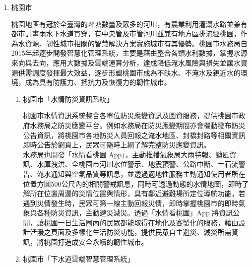 \documentclass[a4paper,12pt]{article}
\begin{document}
\begin{enumerate}
\begin{enumerate}
「脫煤者聯盟」係由英國和加拿大政府共同成立，致力於將燃煤發電轉換為乾淨能源，透過與各國地方政府及組織共同推動老舊燃煤電廠退場，逐步停止使用燃煤以減緩氣候變遷衝擊，並協助實現巴黎協定目標，控制地球氣溫的上升幅度在與「前工業時代」相比最多\(2^{\circ}C\)之範圍。該聯盟現有91個成員，包括32個國家，25個地方政府和34個企業組織，新北市為臺灣第一個，也是繼韓國忠清南道後亞洲第二個加入聯盟的地方政府成員，將持續於國際平臺分享新北市減緩氣候變遷及燃煤退場經驗，增進互動與交流\footnote{\href{https://www.epd.ntpc.gov.tw/Article/Info?ID=6011}{全國第一 新北正式成為「脫煤者聯盟」成員 與英、加等國攜手對抗氣候變遷}\\}。\\
\end{enumerate}

\item 桃園市
\label{sec:orgbcd526b}

桃園地區有冠於全臺灣的埤塘數量及眾多的河川，有農業利用灌溉水路並兼有都市計畫雨水下水道貫穿，有中央管及市管河川並兼有地方區排流經桃園，作為水資源、韌性城市相關的智慧解決方案實施城市有其優勢。桃園市水務局自2015年起逐步開發智慧化管理系統，主要是藉由整合各類水利數據，掌握水源來向與去向，應用大數據及雲端運算分析，達成降低淹水風險與損失並讓水資源供需調度發揮最大效益，逐步形塑桃園市成為不缺水、不淹水及親近水的環境，成為具有防護力、抵抗力及恢復力的韌性城市。\\

\begin{enumerate}
\item 桃園市「水情防災資訊系統」
\label{sec:org59c3a5c}

桃園市水情資訊系統整合各單位防災應變資訊及圖資服務，提供桃園市政府水務局之防災應變平台。例如水務局在防災應變期間亦會機動發布防災公告資訊，將桃園市各地防災人員回報之淹水地區、封橋封路等相關資訊即時公告於網頁上，民眾可隨時上網了解完整防災應變資訊。\\

水務局也開發「水情看桃園 App」，主動推播氣象局大雨特報、颱風資訊、水庫洩洪、全桃園市河川水位警示、地震預警、公路中斷、土石流警告、淹水通知與空氣品質等訊息，並透過適地性服務主動通知使用者所在位置方圓500公尺內的相關警戒訊息，同時可透過動態的水情地圖，即時了解所在位置周邊的災情位置與情形，具有鄰近避難場所定位導航功能，若遇到災情發生時，民眾可第一線主動回報災情，即時掌握桃園市的即時氣象與各種防災資訊，主動避災減災。透過「水情看桃園」App 將資訊公開，讓桃園一日生活圈內的民眾都能取得在地化及客製化的服務，藉由設計活潑之頁面及多樣化生活防災功能，提供民眾自主避災、減災所需資訊，將桃園打造成安全永續的韌性城市。\\
\item 桃園市「下水道雲端智慧管理系統」
\label{sec:org8f65967}


\end{enumerate}
\end{enumerate}
\end{document}
